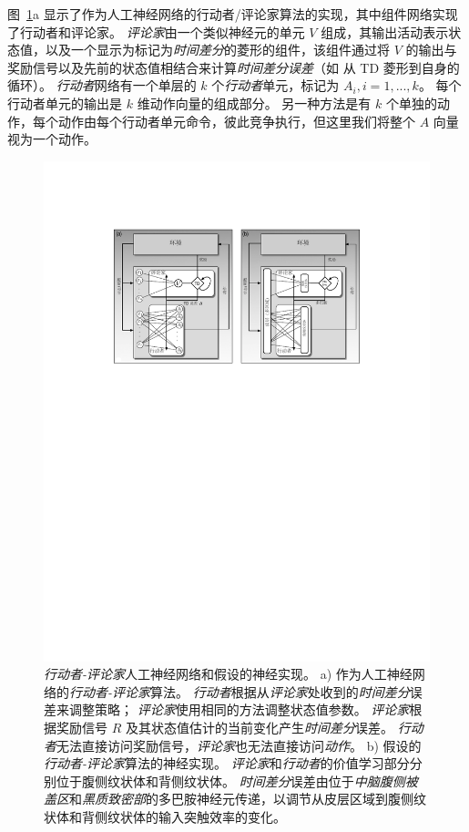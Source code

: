 图~\ref{fig:12_6}a 显示了作为人工神经网络的行动者/评论家算法的实现，其中组件网络实现了行动者和评论家。
\textit{评论家}由一个类似神经元的单元 $V$ 组成，其输出活动表示状态值，以及一个显示为标记为\textit{时间差分}的菱形的组件，该组件通过将 $V$ 的输出与奖励信号以及先前的状态值相结合来计算\textit{时间差分误差}（如 从 TD 菱形到自身的循环）。
\textit{行动者}网络有一个单层的 $k$ 个\textit{行动者}单元，标记为 $A_i, i=1,...,k$。
每个行动者单元的输出是 $k$ 维动作向量的组成部分。 
另一种方法是有 $k$ 个单独的动作，每个动作由每个行动者单元命令，彼此竞争执行，但这里我们将整个 $A$ 向量视为一个动作。


\begin{figure}[!htb]
	\centering
	\includegraphics[width=0.8\linewidth]{chap12/fig_12_6}
	\caption{\textit{行动者-评论家}人工神经网络和假设的神经实现。
		a) 作为人工神经网络的\textit{行动者-评论家}算法。
			\textit{行动者}根据从\textit{评论家}处收到的\textit{时间差分}误差来调整策略；
			\textit{评论家}使用相同的方法调整状态值参数。
			\textit{评论家}根据奖励信号 $R$ 及其状态值估计的当前变化产生\textit{时间差分}误差。
			\textit{行动者}无法直接访问奖励信号，\textit{评论家}也无法直接访问\textit{动作}。
			b) 假设的\textit{行动者-评论家}算法的神经实现。
			\textit{评论家}和\textit{行动者}的价值学习部分分别位于腹侧纹状体和背侧纹状体。
			\textit{时间差分}误差由位于\textit{中脑腹侧被盖区}和\textit{黑质致密部}的多巴胺神经元传递，以调节从皮层区域到腹侧纹状体和背侧纹状体的输入突触效率的变化\cite{takahashi2008silencing}。
		\label{fig:12_6}}
\end{figure}


